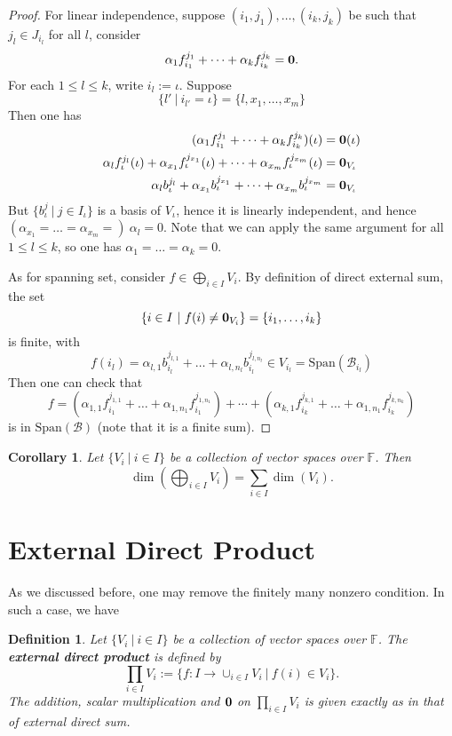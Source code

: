 \documentclass[12pt]{amsbook}
\newtheorem{corollary}[theorem]{Corollary}
\newtheorem{definition}[theorem]{Definition}
\begin{document}
\begin{proof}
    For linear independence, suppose $(i_1, j_1), \dots, (i_k,j_k)$ be such that $j_l \in J_{i_l}$ for all $l$, consider
    $$\alpha_1 f_{i_1}^{j_1} + \dots + \alpha_k f_{i_k}^{j_k} = {\bf 0}.$$
    For each $1 \leq l \leq k$, write $i_l := \iota$. Suppose
    $$\{l'\ |\ i_{l'} = \iota\} = \{l, x_1, \dots, x_m\}$$
    Then one has
    \begin{align*}
    (\alpha_1 f_{i_1}^{j_1} + \dots + \alpha_k f_{i_k}^{j_k})(\iota) &= {\bf 0}(\iota)\\
    \alpha_{l} f_{\iota}^{j_l}(\iota)+ \alpha_{x_1} f_{\iota}^{j_{x_1}}(\iota) + \dots + \alpha_{x_m} f_{\iota}^{j_{x_m}}(\iota) &= {\bf 0}_{V_{\iota}}\\
    \alpha_{l} b_{\iota}^{j_l} + \alpha_{x_1} b_{\iota}^{j_{x_1}} + \dots + \alpha_{x_m} b_{\iota}^{j_{x_m}} &= {\bf 0}_{V_{\iota}}
    \end{align*}
But $\{b_{\iota}^j\ |\ j \in I_{\iota}\}$ is a basis of $V_{\iota}$, hence it is linearly independent, and hence $(\alpha_{x_1} = \dots = \alpha_{x_m} =)\  \alpha_l = 0$. Note that we can apply the same argument for all $1 \leq l \leq k$, so one has $\alpha_1 = \dots = \alpha_k = 0$.

As for spanning set, consider $f \in \bigoplus_{i \in I} V_i$. By definition of direct external sum, the set 
$$\{i \in I\ |\ f(i) \neq {\bf 0}_{V_i}\} = \{i_1, \dots, i_k\}$$
is finite, with
$$f(i_l) = \alpha_{l,1} b_{i_l}^{j_{l,1}} + \dots + \alpha_{l,n_l} b_{i_l}^{j_{l,n_l}} \in V_{i_l} = \mathrm{Span}(\mathcal{B}_{i_l})$$
Then one can check that
$$f = (\alpha_{1,1} f_{i_1}^{j_{1,1}} + \dots + \alpha_{1,n_1} f_{i_1}^{j_{1,n_1}}) + \cdots + (\alpha_{k,1} f_{i_k}^{j_{k,1}} + \dots + \alpha_{1,n_1} f_{i_k}^{j_{k,n_k}})$$
is in $\mathrm{Span}(\mathcal{B})$ (note that it is a finite sum).
\end{proof}


\begin{corollary}
   Let $\{V_i\ |\ i \in I\}$ be a collection of vector spaces over $\mathbb{F}$. Then 
   $$\dim(\bigoplus_{i \in I} V_i) = \sum_{i \in I} \dim(V_i).$$
\end{corollary}

\section{External Direct Product}
As we discussed before, one may remove the finitely many nonzero condition. In such a case, we have
\begin{definition}
Let $\{V_i\ |\ i \in I\}$ be a collection of vector spaces over $\mathbb{F}$. The {\bf external direct product} is defined by
$$\prod_{i \in I} V_i := \{f: I \to \cup_{i \in I} V_i \ |\ f(i) \in V_i\}.$$
The addition, scalar multiplication and ${\bf 0}$ on $\prod_{i \in I} V_i$ is given exactly as in that of external direct sum.
\end{definition}
\end{document}
